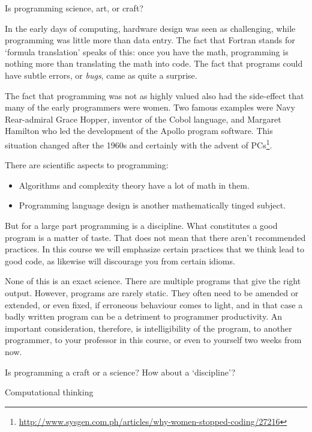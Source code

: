  {Is programming science, art, or craft?}

In the early days of computing, hardware design was seen as
challenging, while programming was little more than data entry. The
fact that Fortran stands for `formula translation' speaks of this:
once you have the math, programming is nothing more than translating
the math into code. The fact that programs could have subtle errors,
or \emph{bugs}, came as quite a surprise.

The fact that programming was not as highly valued also had the
side-effect that many of the early programmers were women. Two famous
examples were Navy Rear-admiral Grace Hopper, inventor of the Cobol
language, and Margaret Hamilton who led the development of the Apollo
program software. This situation changed after the 1960s and certainly
with the advent of
PCs\footnote{\url{http://www.sysgen.com.ph/articles/why-women-stopped-coding/27216}}.

There are scientific aspects to programming:
\begin{itemize}
\item Algorithms and complexity theory have a lot of math in them.
\item Programming language design is another mathematically tinged subject.
\end{itemize}

But for a large part programming is a discipline. What constitutes a
good program is a matter of taste. That does not mean that there
aren't recommended practices. In this course we will emphasize certain
practices that we think lead to good code, as likewise will discourage
you from certain idioms.

None of this is an exact science. There are multiple programs that
give the right output. However, programs are rarely static. They often
need to be amended or extended, or even fixed, if erroneous behaviour
comes to light, and in that case a badly written program can be a
detriment to programmer productivity. An important consideration,
therefore, is intelligibility of the program, to another programmer,
to your professor in this course, or even to yourself two weeks from
now.

\begin{slide}{Is programming a craft or a science?}
  \label{sl:programmingcraft}
  How about a `discipline'?
\end{slide}

 {Computational thinking}

